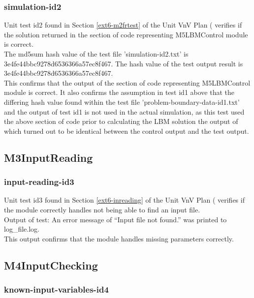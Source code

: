 \documentclass[12pt, titlepage]{article}
\begin{document}
\subsubsection{simulation-id2}
\label{M2id2}

Unit test id2 found in Section \ref{ext6-m2frtest} of the Unit VnV Plan (\citet{LBM_UVNV_PM} verifies if the solution returned in the section of code representing M5LBMControl module is correct.\\

\noindent The md5sum hash value of the test file 'simulation-id2.txt' is\\  3e4fe44bbc9278d6536366a57ec8f467. The hash value of the test output result is 3e4fe44bbc9278d6536366a57ec8f467.\\ 

\noindent This confirms that the output of the section of code representing M5LBMControl module is correct. It also confirms the assumption in test id1 above that the differing hash value found within the test file 'problem-boundary-data-id1.txt' and the output of test id1 is not used in the actual simulation, as this test used the above section of code prior to calculating the LBM solution the output of which turned out to be identical between the control output and the test output. 

\subsection{M3InputReading}
\subsubsection{input-reading-id3}

Unit test id3 found in Section \ref{ext6-inreading} of the Unit VnV Plan (\citet{LBM_UVNV_PM} verifies if the module correctly handles not being able to find an input file.\\

\noindent Output of test: An error message of ``Input file not found.'' was printed to log\_file.log.\\

\noindent This output confirms that the module handles missing parameters correctly. 

\subsection{M4InputChecking}
\subsubsection{known-input-variables-id4}
\end{document}
